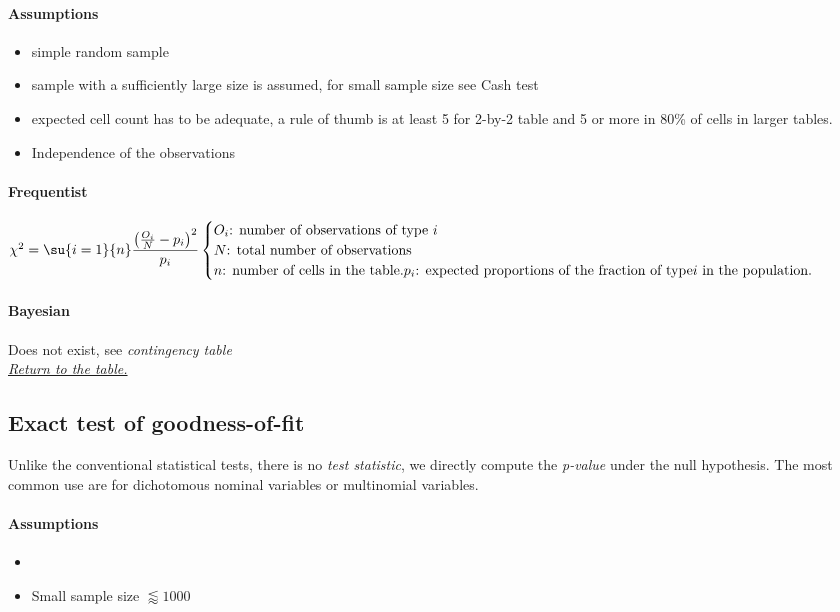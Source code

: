 \paragraph{Assumptions}
\begin{itemize}
    \item simple random sample
    \item sample with a sufficiently large size is assumed, for small sample size see Cash test
    \item expected cell count has to be adequate, a rule of thumb is at least 5 for 2-by-2
        table and 5 or more in 80\% of cells in larger tables.
    \item Independence of the observations
\end{itemize}

\paragraph{Frequentist}
$\chi^{2} = \su{i=1}{n}\dfrac{\left(\frac{O_{i}}{N} - p_{i} \right)^{2}}{p_{i}}
\begin{cases}
    O_{i}\text{: number of observations of type }i \\
    N\text{: total number of observations}\\
    n\text{: number of cells in the table.}
    p_{i}\text{: expected proportions of the fraction of type}i\text{ in the population.}
\end{cases}
$

\paragraph{Bayesian}
Does not exist, see \emph{contingency table}\\

\textit{\hyperref[statistical_method_table]{Return to the table.}}


\subsection{Exact test of goodness-of-fit}
Unlike the conventional statistical tests, there is no \emph{test statistic}, we directly
compute the \emph{p-value} under the null hypothesis.
The most common use are for dichotomous nominal variables or multinomial variables.

\paragraph{Assumptions}
\begin{itemize}
    \item {}
    \item Small sample size $\lessapprox 1000$
\end{itemize}

